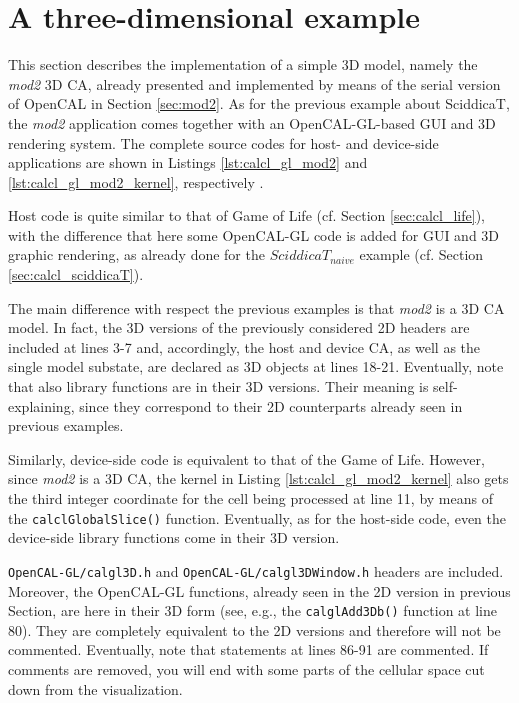\section{A three-dimensional example}

This section describes the implementation of a simple 3D model, namely
the \emph{mod2} 3D CA, already presented and implemented by means of
the serial version of OpenCAL in Section \ref{sec:mod2}. As for the
previous example about SciddicaT, the \emph{mod2} application comes
together with an OpenCAL-GL-based GUI and 3D rendering system. The
complete source codes for host- and device-side applications are shown
in Listings \ref{lst:calcl_gl_mod2} and
\ref{lst:calcl_gl_mod2_kernel}, respectively .







Host code is quite similar to that of Game of Life (cf. Section
\ref{sec:calcl_life}), with the difference that here some OpenCAL-GL
code is added for GUI and 3D graphic rendering, as already done for
the $SciddicaT_{naive}$ example (cf. Section
\ref{sec:calcl_sciddicaT}).

The main difference with respect the previous examples is that
\emph{mod2} is a 3D CA model. In fact, the 3D versions of the
previously considered 2D headers are included at lines 3-7 and,
accordingly, the host and device CA, as well as the single model
substate, are declared as 3D objects at lines 18-21. Eventually, note
that also library functions are in their 3D versions. Their meaning is
self-explaining, since they correspond to their 2D counterparts already
seen in previous examples.

Similarly, device-side code is equivalent to that of the Game of
Life. However, since \emph{mod2} is a 3D CA, the kernel in Listing
\ref{lst:calcl_gl_mod2_kernel} also gets the third integer coordinate
for the cell being processed at line 11, by means of the
\verb'calclGlobalSlice()' function. Eventually, as for the host-side
code, even the device-side library functions come in their 3D version.

\verb'OpenCAL-GL/calgl3D.h' and \verb'OpenCAL-GL/calgl3DWindow.h'
headers are included. Moreover, the OpenCAL-GL functions, already seen
in the 2D version in previous Section, are here in their 3D form (see,
e.g., the \verb'calglAdd3Db()' function at line 80). They
are completely equivalent to the 2D versions and therefore will
not be commented. Eventually, note that statements at lines 86-91 are
commented. If comments are removed, you will end with some parts of
the cellular space cut down from the visualization.

